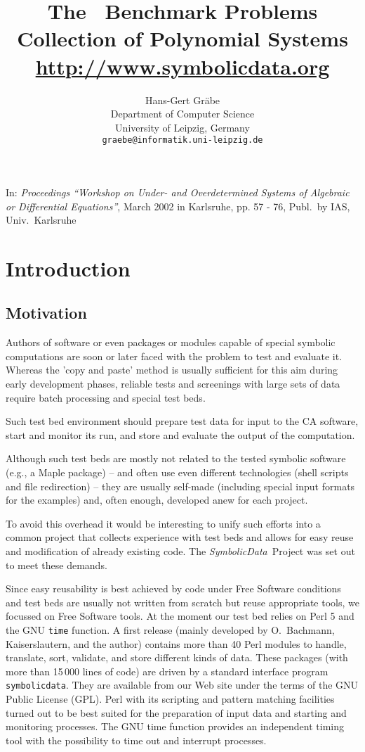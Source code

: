 \documentclass[11pt]{article}
\date{}
\title{The \SD\ Benchmark Problems\\ Collection of Polynomial
Systems\\[12pt] {\large\url{http://www.symbolicdata.org}} }
\author{
Hans-Gert Gr\"abe\\
Department of Computer Science\\
University of Leipzig, Germany\\
{\tt graebe@informatik.uni-leipzig.de}
}
\newcommand{\SD}{{\em Symbo\-lic\-Data}}
\begin{document}
\maketitle

{\small In: {\em Proceedings ``Workshop on Under- and Overdetermined
Systems of Algebraic or Differential Equations''}, March 2002 in
Karlsruhe, pp. 57 - 76, Publ.\ by IAS, Univ.\ Karlsruhe}

\thispagestyle{empty}
\section{Introduction}

\subsection{Motivation}

Authors of software or even packages or modules capable of special
symbolic computations are soon or later faced with the problem to test
and evaluate it.  Whereas the 'copy and paste' method is usually
sufficient for this aim during early development phases, reliable
tests and screenings with large sets of data require batch processing
and special test beds.

Such test bed environment should prepare test data for input to the CA
software, start and monitor its run, and store and evaluate the output
of the computation.

Although such test beds are mostly not related to the tested
symbolic software (e.g., a Maple package) -- and often use even
different technologies (shell scripts and file redirection) --
they are usually self-made (including special input formats for
the examples) and, often enough, developed anew for each project.

To avoid this overhead it would be interesting to unify such efforts
into a common project that collects experience with test beds and
allows for easy reuse and modification of already existing code.  The
\SD\ Project was set out to meet these demands.

Since easy reusability is best achieved by code under Free Software
conditions and test beds are usually not written from scratch but
reuse appropriate tools, we focussed on Free Software tools.  At the
moment our test bed relies on Perl 5 and the GNU {\tt time} function.
A first release (mainly developed by O.~Bachmann, Kaiserslautern, and
the author) contains more than 40 Perl modules to handle, translate,
sort, validate, and store different kinds of data.  These packages
(with more than 15\,000 lines of code) are driven by a standard
interface program {\tt symbolicdata}.  They are available from our Web
site under the terms of the GNU Public License (GPL). Perl with its
scripting and pattern matching facilities turned out to be best suited
for the preparation of input data and starting and monitoring
processes.  The GNU {time} function provides an independent timing
tool with the possibility to time out and interrupt processes.
\end{document}
